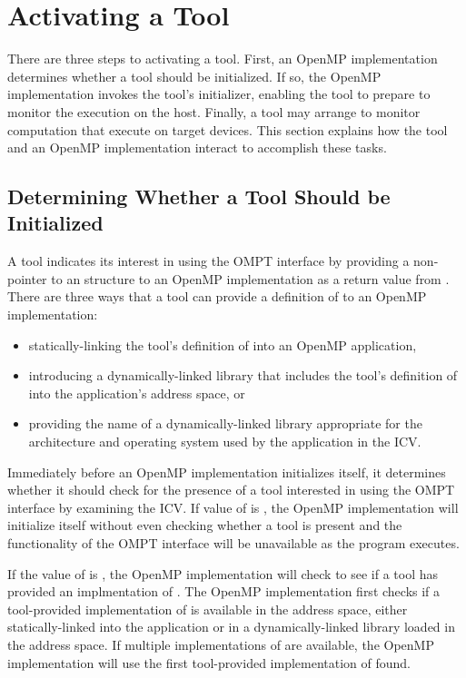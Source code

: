 \section{Activating a Tool}
\label{sec:ompt-initialization}

There are three steps to activating a tool. First, an OpenMP
implementation determines whether a tool should be initialized.  If
so, the OpenMP implementation invokes the tool's initializer, enabling
the tool to prepare to monitor the execution on the host. Finally, a
tool may arrange to monitor computation that execute 
on target devices. This section explains how the tool and an 
OpenMP implementation interact to accomplish these tasks.

\subsection{Determining Whether a Tool Should be Initialized}
\label{sec:ompt-check-tool}

A tool indicates its interest in using the OMPT interface 
by providing a non- pointer to an 
structure to an OpenMP implementation as a return value from 
. There are three ways
that a tool can provide a definition of  to an
OpenMP implementation:

\begin{itemize}
\item statically-linking the tool's definition of 
  into an OpenMP application, 
\item introducing a dynamically-linked library that includes the tool's definition
  of  into the application's address space, or 
\item providing the name of a dynamically-linked library appropriate
  for the architecture and operating system used by the application
  in the  ICV.
\end{itemize}

Immediately before an OpenMP implementation initializes itself, it
determines whether it should check for the presence of a tool
interested in using the OMPT interface by examining the 
ICV.  If value of  is , the OpenMP
implementation will initialize itself without even checking whether a
tool is present and the functionality of the OMPT interface will be
unavailable as the program executes.
 
If the value of  is , the OpenMP
implementation will check to see if a tool has provided an
implmentation of .  The OpenMP implementation first
checks if a tool-provided implementation of  is
available in the address space, either statically-linked into the
application or in a dynamically-linked library loaded in the address
space. If multiple implementations of  are available,
the OpenMP implementation will use the first tool-provided
implementation of  found.

